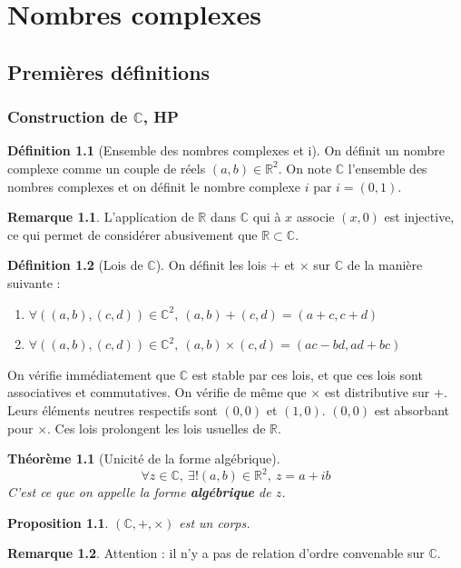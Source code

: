 \documentclass[french]{book}
\newcommand{\R}{\mathbb{R}}
\newcommand{\C}{\mathbb{C}}
\theoremstyle{plain}
\newtheorem{thm}{Théorème}[chapter]
\newtheorem{prop}{Proposition}[chapter]
\theoremstyle{definition}
\newtheorem{dfn}{Définition}[chapter]
\newtheorem{rmq}{Remarque}[chapter]
\theoremstyle{remark}
\begin{document}
\newpage
\chapter{Nombres complexes} %
\section{Premières définitions}
\subsection{Construction de $\C$, HP}
\begin{dfn}[Ensemble des nombres complexes et i]
	On définit un nombre complexe comme un couple de réels $(a,b) \in \R^2$. On note $\C$ l'ensemble des nombres complexes et on définit le nombre complexe $i$ par $i=(0,1)$.
\end{dfn}
\begin{rmq}L'application de $\R$ dans $\C$ qui à $x$ associe $(x,0)$ est injective, ce qui permet de considérer abusivement que $\R \subset \C$. \end{rmq} 
\begin{dfn}[Lois de $\C$]
	On définit les lois $+$ et $\times$ sur $\C$ de la manière suivante :
	\begin{enumerate}
		\item $\forall ((a,b),(c,d))\in\C^2, \ (a,b)+(c,d)=(a+c,c+d)$
		\item $\forall ((a,b),(c,d))\in\C^2, \ (a,b)\times(c,d)=(ac-bd,ad+bc)$
	\end{enumerate}
	On vérifie immédiatement que $\C$ est stable par ces lois, et que ces lois sont associatives et commutatives. On vérifie de même que $\times$ est distributive sur $+$. Leurs éléments neutres respectifs sont $(0,0)$ et $(1,0)$. $(0,0)$ est absorbant pour $\times$. Ces lois prolongent les lois usuelles de $\R$. 
\end{dfn}
\begin{thm}[Unicité de la forme algébrique]
	$$\forall z \in \C, \ \exists!(a,b)\in\R^2, \ z=a+ib$$
	C'est ce que on appelle la forme \textbf{algébrique} de $z$.
\end{thm}
\begin{prop}
	$(\C,+,\times)$ est un corps.
\end{prop}
\begin{rmq}
	Attention : il n'y a pas de relation d'ordre convenable sur $\C$.
\end{rmq}
\end{document}
